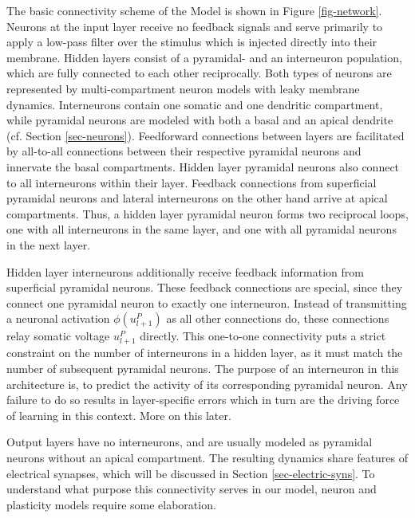 
The basic connectivity scheme of the Model is shown in Figure \ref{fig-network}. Neurons at the input layer receive no
feedback signals and serve primarily to apply a low-pass filter over the stimulus which is injected directly into their
membrane.  Hidden layers consist of a pyramidal- and an interneuron population, which are fully connected to each other
reciprocally. Both types of neurons are represented by multi-compartment neuron models with leaky membrane dynamics.
Interneurons contain one somatic and one dendritic compartment, while pyramidal neurons are modeled with both a basal
and an apical dendrite (cf. Section \ref{sec-neurons}).  Feedforward connections between layers are facilitated by
all-to-all connections between their respective pyramidal neurons and innervate the basal compartments. Hidden layer
pyramidal neurons also connect to all interneurons within their layer. Feedback connections from superficial pyramidal
neurons and lateral interneurons on the other hand arrive at apical compartments. Thus, a hidden layer pyramidal neuron
forms two reciprocal loops, one with all interneurons in the same layer, and one with all pyramidal neurons in the next
layer. 

Hidden layer interneurons additionally receive feedback information from superficial pyramidal neurons. These feedback
connections are special, since they connect one pyramidal neuron to exactly one interneuron. Instead of transmitting a
neuronal activation $\phi(u_{l+1}^P)$ as all other connections do, these connections relay somatic voltage $u_{l+1}^P$
directly. This one-to-one connectivity puts a strict constraint on the number of interneurons in a hidden layer, as it
must match the number of subsequent pyramidal neurons. The purpose of an interneuron in this architecture is, to predict
the activity of its corresponding pyramidal neuron. Any failure to do so results in layer-specific errors which in turn
are the driving force of learning in this context. More on this later.


Output layers
have no interneurons, and are usually modeled as pyramidal neurons without an apical compartment. The resulting dynamics
share features of electrical synapses, which will be discussed in Section \ref{sec-electric-syns}. To understand what
purpose this connectivity serves in our model, neuron and plasticity models require some elaboration.


